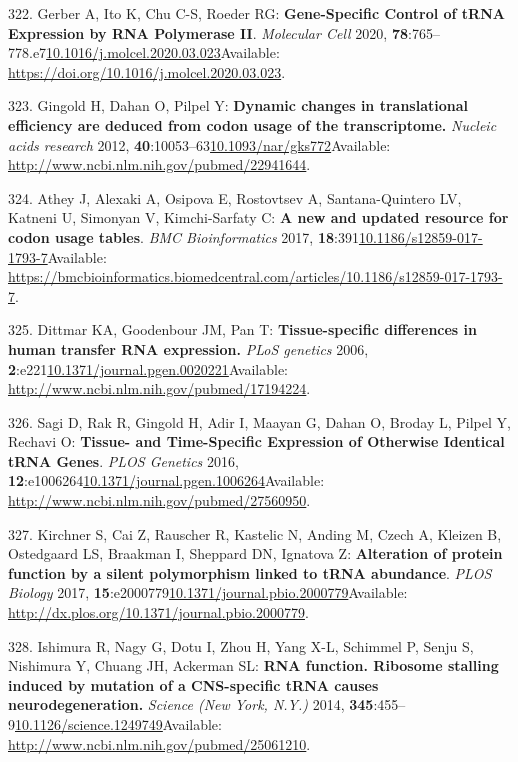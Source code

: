 \documentclass[
]{book}
\begin{document}
\leavevmode\hypertarget{ref-Gerber2020}{}%
322. Gerber A, Ito K, Chu C-S, Roeder RG: \textbf{Gene-Specific Control of tRNA Expression by RNA Polymerase II}. \emph{Molecular Cell} 2020, \textbf{78}:765--778.e7\href{https://doi.org/10.1016/j.molcel.2020.03.023}{10.1016/j.molcel.2020.03.023}Available: \url{https://doi.org/10.1016/j.molcel.2020.03.023}.

\leavevmode\hypertarget{ref-Gingold2012}{}%
323. Gingold H, Dahan O, Pilpel Y: \textbf{Dynamic changes in translational efficiency are deduced from codon usage of the transcriptome.} \emph{Nucleic acids research} 2012, \textbf{40}:10053--63\href{https://doi.org/10.1093/nar/gks772}{10.1093/nar/gks772}Available: \url{http://www.ncbi.nlm.nih.gov/pubmed/22941644}.

\leavevmode\hypertarget{ref-Athey2017}{}%
324. Athey J, Alexaki A, Osipova E, Rostovtsev A, Santana-Quintero LV, Katneni U, Simonyan V, Kimchi-Sarfaty C: \textbf{A new and updated resource for codon usage tables}. \emph{BMC Bioinformatics} 2017, \textbf{18}:391\href{https://doi.org/10.1186/s12859-017-1793-7}{10.1186/s12859-017-1793-7}Available: \url{https://bmcbioinformatics.biomedcentral.com/articles/10.1186/s12859-017-1793-7}.

\leavevmode\hypertarget{ref-Dittmar2006}{}%
325. Dittmar KA, Goodenbour JM, Pan T: \textbf{Tissue-specific differences in human transfer RNA expression.} \emph{PLoS genetics} 2006, \textbf{2}:e221\href{https://doi.org/10.1371/journal.pgen.0020221}{10.1371/journal.pgen.0020221}Available: \url{http://www.ncbi.nlm.nih.gov/pubmed/17194224}.

\leavevmode\hypertarget{ref-Sagi2016}{}%
326. Sagi D, Rak R, Gingold H, Adir I, Maayan G, Dahan O, Broday L, Pilpel Y, Rechavi O: \textbf{Tissue- and Time-Specific Expression of Otherwise Identical tRNA Genes}. \emph{PLOS Genetics} 2016, \textbf{12}:e1006264\href{https://doi.org/10.1371/journal.pgen.1006264}{10.1371/journal.pgen.1006264}Available: \url{http://www.ncbi.nlm.nih.gov/pubmed/27560950}.

\leavevmode\hypertarget{ref-Kirchner2017}{}%
327. Kirchner S, Cai Z, Rauscher R, Kastelic N, Anding M, Czech A, Kleizen B, Ostedgaard LS, Braakman I, Sheppard DN, Ignatova Z: \textbf{Alteration of protein function by a silent polymorphism linked to tRNA abundance}. \emph{PLOS Biology} 2017, \textbf{15}:e2000779\href{https://doi.org/10.1371/journal.pbio.2000779}{10.1371/journal.pbio.2000779}Available: \url{http://dx.plos.org/10.1371/journal.pbio.2000779}.

\leavevmode\hypertarget{ref-Ishimura2015}{}%
328. Ishimura R, Nagy G, Dotu I, Zhou H, Yang X-L, Schimmel P, Senju S, Nishimura Y, Chuang JH, Ackerman SL: \textbf{RNA function. Ribosome stalling induced by mutation of a CNS-specific tRNA causes neurodegeneration.} \emph{Science (New York, N.Y.)} 2014, \textbf{345}:455--9\href{https://doi.org/10.1126/science.1249749}{10.1126/science.1249749}Available: \url{http://www.ncbi.nlm.nih.gov/pubmed/25061210}.
\end{document}
